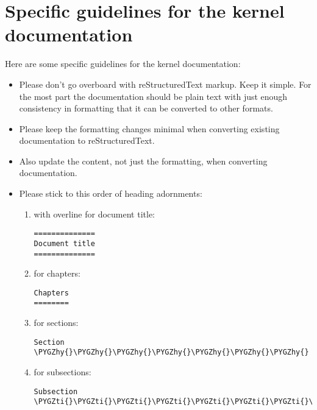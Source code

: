 \documentclass[a4paper,8pt,english]{sphinxmanual}
\def\PYGZhy{\char`\-}
\def\PYGZti{\char`\~}
\begin{document}
\section{Specific guidelines for the kernel documentation}
\label{doc-guide/sphinx:sphinx-specific-markup-constructs}\label{doc-guide/sphinx:specific-guidelines-for-the-kernel-documentation}
Here are some specific guidelines for the kernel documentation:
\begin{itemize}
\item {} 
Please don't go overboard with reStructuredText markup. Keep it
simple. For the most part the documentation should be plain text with
just enough consistency in formatting that it can be converted to
other formats.

\item {} 
Please keep the formatting changes minimal when converting existing
documentation to reStructuredText.

\item {} 
Also update the content, not just the formatting, when converting
documentation.

\item {} 
Please stick to this order of heading adornments:
\begin{enumerate}
\item {} 
\code{=} with overline for document title:

\begin{Verbatim}[commandchars=\\\{\}]
==============
Document title
==============
\end{Verbatim}

\item {} 
\code{=} for chapters:

\begin{Verbatim}[commandchars=\\\{\}]
Chapters
========
\end{Verbatim}

\item {} 
\code{-} for sections:

\begin{Verbatim}[commandchars=\\\{\}]
Section
\PYGZhy{}\PYGZhy{}\PYGZhy{}\PYGZhy{}\PYGZhy{}\PYGZhy{}\PYGZhy{}
\end{Verbatim}

\item {} 
\code{\textasciitilde{}} for subsections:

\begin{Verbatim}[commandchars=\\\{\}]
Subsection
\PYGZti{}\PYGZti{}\PYGZti{}\PYGZti{}\PYGZti{}\PYGZti{}\PYGZti{}\PYGZti{}\PYGZti{}\PYGZti{}
\end{Verbatim}


\end{enumerate}
\end{itemize}
\end{document}
